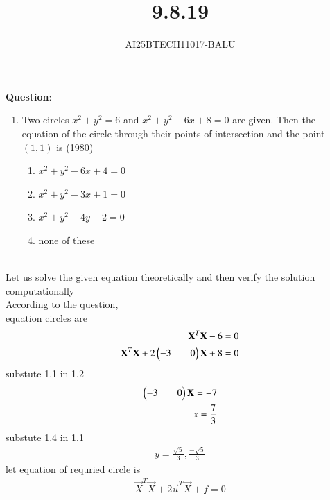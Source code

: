 \documentclass[journal]{IEEEtran}
\begin{document}

\vspace{3cm}
\title{9.8.19}
\author{AI25BTECH11017-BALU}
 \maketitle
{\let\newpage\relax\maketitle}
\renewcommand{\thefigure}{\theenumi}
\renewcommand{\thetable}{\theenumi}
\setlength{\intextsep}{10pt} %
\renewcommand{\thetable}{\theenumi}
\textbf{Question}:\\
\begin{enumerate}
    \item Two circles $x^{2}+y^{2}=6$ and $x^{2}+y^{2}-6x+8=0$ are given. 
    Then the equation of the circle through their points of intersection 
    and the point $(1,1)$ is (1980)
    \begin{enumerate}[label=(\alph*)]
        \item $x^{2}+y^{2}-6x+4=0$
        \item $x^{2}+y^{2}-3x+1=0$
        \item $x^{2}+y^{2}-4y+2=0$
        \item none of these
    \end{enumerate}
\end{enumerate}
\solution \\
Let us solve the given equation theoretically and then verify the solution computationally \\
According to the question, \\
equation circles are
\begin{align}
\mathbf{X}^T\mathbf{X}-6=0\\
\mathbf{X}^T\mathbf{X}+2\begin{pmatrix}-3&&0\end{pmatrix}\mathbf{X}+8=0
\end{align}
substute 1.1 in 1.2
\begin{align}
  \begin{pmatrix}-3&&0\end{pmatrix}\mathbf{X}=-7\\
  x=\frac{7}{3}
\end{align}
substute 1.4 in 1.1
\begin{align}
   y=\frac{\sqrt{5}}{3},\frac{-\sqrt{5}}{3}
\end{align}
let equation of requried circle is
\begin{align}
  \vec{X}^T\vec{X}+2\vec{u}^T\vec{X}+f=0\\
\end{align}
\end{document}
